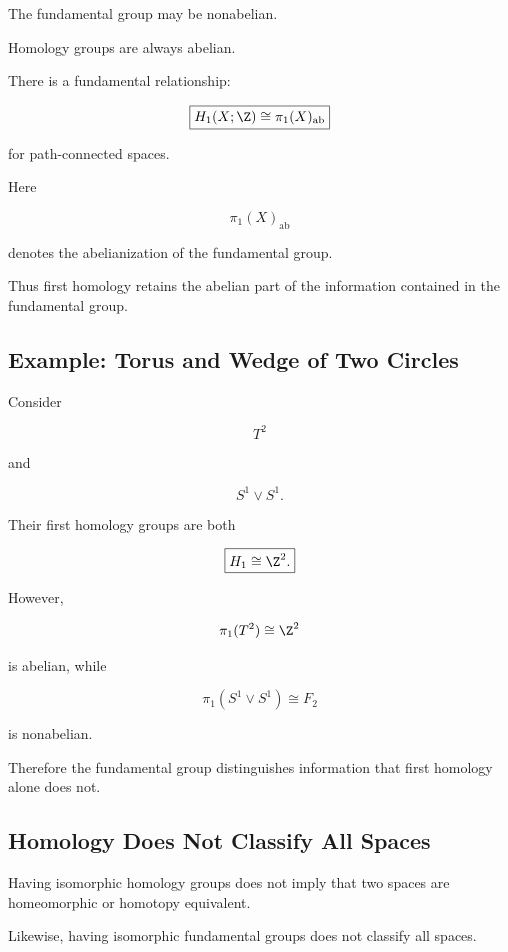 The fundamental group may be nonabelian.

Homology groups are always abelian.

There is a fundamental relationship:

\[
\boxed{
H_1(X;\Z)
\cong
\pi_1(X)_{\mathrm{ab}}
}
\]

for path-connected spaces.

Here

\[
\pi_1(X)_{\mathrm{ab}}
\]

denotes the abelianization of the fundamental group.

Thus first homology retains the abelian part of the information contained in
the fundamental group.

\subsection{Example: Torus and Wedge of Two Circles}
\label{subsec:torus-wedge-comparison}

Consider

\[
T^2
\]

and

\[
S^1\vee S^1.
\]

Their first homology groups are both

\[
\boxed{
H_1\cong\Z^2.
}
\]

However,

\[
\pi_1(T^2)
\cong
\Z^2
\]

is abelian, while

\[
\pi_1(S^1\vee S^1)
\cong
F_2
\]

is nonabelian.

Therefore the fundamental group distinguishes information that first
homology alone does not.

\subsection{Homology Does Not Classify All Spaces}
\label{subsec:homology-not-complete}

Having isomorphic homology groups does not imply that two spaces are
homeomorphic or homotopy equivalent.

Likewise, having isomorphic fundamental groups does not classify all spaces.

